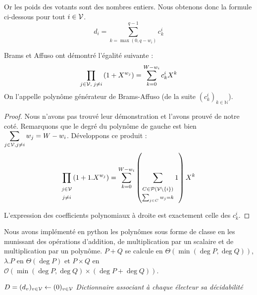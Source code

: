 Or les poids des votants sont des nombres entiers.
Nous obtenons donc la formule ci-dessous pour tout $i \in \mathcal{V}$.
\begin{equation}
	d_i = \sum_{k=\max(0, q-w_i)}^{q-1} c_k^i
\end{equation}

\begin{proposition}
	Brams et Affuso ont démontré l'égalité suivante :
	\begin{equation}
		\prod_{j \in \mathcal{V}, \; j \neq i} \left(1 + X^{w_j}\right)
		= \sum_{k=0}^{W-w_i} c_k^i X^k
	\end{equation}
	On l'appelle polynôme générateur de Brams-Affuso (de la suite $(c_k^i)_{k \in \mathbb{N}}$).
\end{proposition}

\begin{proof}
	Nous n'avons pas trouvé leur démonstration et l'avons prouvé de notre coté.
	Remarquons que le degré du polynôme de gauche est bien $\displaystyle \sum_{j \in \mathcal{V}, j \neq i} w_j  = W - w_i$.
	Développons ce produit :
	\begin{equation*}
		\prod_{\begin{matrix} \scriptstyle j \in \mathcal{V} \\ \scriptstyle j \neq i \end{matrix} } \left(1 + 1 . X^{w_j}\right)
		= \sum_{k = 0}^{W - w_i} \left( \sum_{\begin{matrix} \scriptstyle C \in \mathcal{P}\left(\mathcal{V} \setminus \{i\}\right) \\ \scriptstyle \sum_{j \in C} w_j = k \end{matrix}} 1 \right) X^k
	\end{equation*}
	
	L'expression des coefficients polynomiaux à droite est exactement celle des $c_k^i$.
\end{proof}


Nous avons implémenté en python les polynômes sous forme de classe en les munissant des opérations d'addition, de multiplication par un scalaire et de multiplication par un polynôme. $P + Q$ se calcule en $\Theta(\min(\deg P, \deg Q))$, $\lambda . P$ en $\Theta(\deg P)$ et $P \times Q$ en $\mathcal{O}(\min(\deg P, \deg Q) \times (\deg P + \deg Q))$.

\begin{algorithm}[H]
	\caption{Calcul de la décidabilité avec les polynômes générateurs de Brams-Affuso}
	$D = (d_v)_{v \in \mathcal{V}} \gets (0)_{v \in \mathcal{V}}$ \quad \emph{Dictionnaire associant à chaque électeur sa décidabilité} \\
\end{algorithm}

